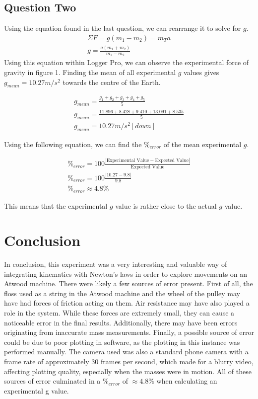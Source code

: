 \documentclass[10pt,twocolumn,letterpaper]{article}
\begin{document}
\subsection{Question Two}
Using the equation found in the last question, we can rearrange it to solve for \(g\).
\begin{align}
    \nonumber \Sigma F = g(m_{1} - m_{2}) = m_{T}a \\
    \nonumber g = \frac{a(m_{1} + m_{2})}{m_{1} - m_{2}}
\end{align}
Using this equation within Logger Pro, we can observe the experimental force of gravity in figure 1. Finding the mean of all experimental \(g\) values gives \(g_{mean} = 10.27 m/s^2\) towards the centre of the Earth.

\begin{align}
    \nonumber g_{mean} = \frac{g_{1} + g_{2} + g_{3} + g_{4} + g_{5}}{5} \\
    \nonumber g_{mean} = \frac{11.896 + 8.428 + 9.410 + 13.091 + 8.535}{5} \\
    \nonumber g_{mean} = 10.27 m/s^2 [down]
\end{align}

Using the following equation, we can find the \(\%_{error}\) of the mean experimental \(g\).

\begin{align}
    \nonumber \%_{error} = 100\frac{|\text{Experimental Value} - \text{Expected Value}|}{\text{Expected Value}} \\
    \nonumber \%_{error} = 100\frac{|10.27-9.8|}{9.8} \\
    \nonumber \%_{error} \approx 4.8\%
\end{align}

This means that the experimental \(g\) value is rather close to the actual \(g\) value. 

\section{Conclusion}
In conclusion, this experiment was a very interesting and valuable way of integrating kinematics with Newton's laws in order to explore movements on an Atwood machine. 
There were likely a few sources of error present. First of all, the floss used as a string in the Atwood machine and the wheel of the pulley may have had forces of friction acting on them. Air resistance may have also played a role in the system. While these forces are extremely small, they can cause a noticeable error in the final results. Additionally, there may have been errors originating from inaccurate mass measurements. Finally, a possible source of error could be due to poor plotting in software, as the plotting in this instance was performed manually. The camera used was also a standard phone camera with a frame rate of approximately 30 frames per second, which made for a blurry video, affecting plotting quality, especially when the masses were in motion.
All of these sources of error culminated in a \(\%_{error}\) of \(\approx 4.8\%\) when calculating an experimental g value. 
\end{document}
